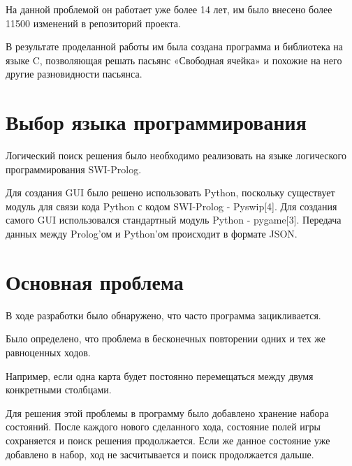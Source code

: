 \documentclass[12pt]{report}
\begin{document}
На данной проблемой он работает уже более 14 лет, им было внесено более 11500 изменений в репозиторий проекта.

В результате проделанной работы им была создана программа и библиотека на языке C, позволяющая решать пасьянс «Свободная ячейка» и похожие на него другие разновидности пасьянса. 

\chapter{Выбор языка программирования}
Логический поиск решения было необходимо реализовать на языке логического программирования SWI-Prolog.

Для создания GUI было решено использовать Python, поскольку существует модуль для связи кода Python с кодом SWI-Prolog - Pyswip[4].
Для создания самого GUI использовался стандартный модуль Python - pygame[3].
Передача данных между Prolog'ом и Python'ом происходит в формате JSON.
\chapter{Основная проблема}
В ходе разработки было обнаружено, что часто программа зацикливается.

Было определено, что проблема в бесконечных повторении одних и тех же равноценных ходов. 

Например, если одна карта будет постоянно перемещаться между двумя конкретными столбцами. 

Для решения этой проблемы в программу было добавлено хранение набора состояний. После каждого нового сделанного хода, состояние полей игры сохраняется и поиск решения продолжается. Если же данное состояние уже добавлено в набор, ход не засчитывается и поиск продолжается дальше.
\end{document}
